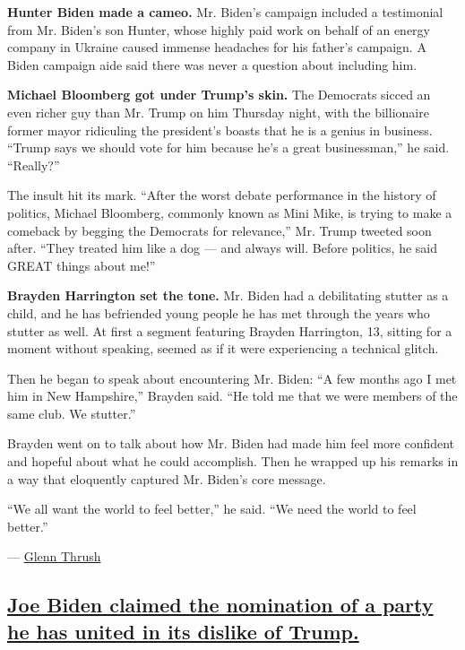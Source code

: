 \textbf{Hunter Biden made a cameo.} Mr. Biden's campaign included a
testimonial from Mr. Biden's son Hunter, whose highly paid work on
behalf of an energy company in Ukraine caused immense headaches for his
father's campaign. A Biden campaign aide said there was never a question
about including him.

\textbf{Michael Bloomberg got under Trump's skin.} The Democrats sicced
an even richer guy than Mr. Trump on him Thursday night, with the
billionaire former mayor ridiculing the president's boasts that he is a
genius in business. ``Trump says we should vote for him because he's a
great businessman,'' he said. ``Really?''

The insult hit its mark. ``After the worst debate performance in the
history of politics, Michael Bloomberg, commonly known as Mini Mike, is
trying to make a comeback by begging the Democrats for relevance,'' Mr.
Trump tweeted soon after. ``They treated him like a dog --- and always
will. Before politics, he said GREAT things about me!''

\textbf{Brayden Harrington set the tone.} Mr. Biden had a debilitating
stutter as a child, and he has befriended young people he has met
through the years who stutter as well. At first a segment featuring
Brayden Harrington, 13, sitting for a moment without speaking, seemed as
if it were experiencing a technical glitch.

Then he began to speak about encountering Mr. Biden: ``A few months ago
I met him in New Hampshire,'' Brayden said. ``He told me that we were
members of the same club. We stutter.''

Brayden went on to talk about how Mr. Biden had made him feel more
confident and hopeful about what he could accomplish. Then he wrapped up
his remarks in a way that eloquently captured Mr. Biden's core message.

``We all want the world to feel better,'' he said. ``We need the world
to feel better.''

--- \href{https://www.nytimes3xbfgragh.onion/by/glenn-thrush}{Glenn
Thrush}

\hypertarget{joe-biden-claimed-the-nomination-of-a-party-he-has-united-in-its-dislike-of-trump}{%
\subsection{\texorpdfstring{\protect\hyperlink{joe-biden-claimed-the-nomination-of-a-party-he-has-united-in-its-dislike-of-trump}{Joe
Biden claimed the nomination of a party he has united in its dislike of
Trump.}}{Joe Biden claimed the nomination of a party he has united in its dislike of Trump.}}\label{joe-biden-claimed-the-nomination-of-a-party-he-has-united-in-its-dislike-of-trump}}

